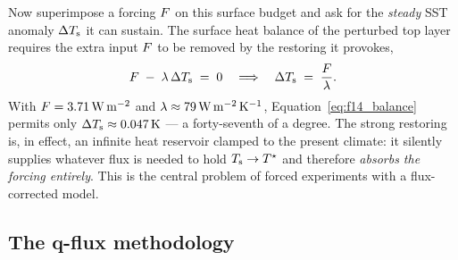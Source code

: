 
Now superimpose a forcing $F$ on this surface budget and ask for the
\emph{steady} SST anomaly $\Delta T_{\mathrm{s}}$ it can sustain. The surface heat balance
of the perturbed top layer requires the extra input $F$ to be removed by the
restoring it provokes,
\begin{equation}
  F \;-\; \lambda\,\Delta T_{\mathrm{s}} \;=\; 0
  \quad\Longrightarrow\quad
  \Delta T_{\mathrm{s}} \;=\; \frac{F}{\lambda}.
  \label{eq:f14_balance}
\end{equation}
With $F=3.71\,\mathrm{W\,m^{-2}}$ and $\lambda\approx
79\,\mathrm{W\,m^{-2}\,K^{-1}}$, Equation~\eqref{eq:f14_balance} permits only
$\Delta T_{\mathrm{s}}\approx 0.047\,\mathrm{K}$ --- a forty-seventh of a degree. The strong
restoring is, in effect, an infinite heat reservoir clamped to the present
climate: it silently supplies whatever flux is needed to hold $T_{\mathrm{s}}\to T^{\star}$ and
therefore \emph{absorbs the forcing entirely}. This is the central problem of
forced experiments with a flux-corrected model.

\subsection{The q-flux methodology}

